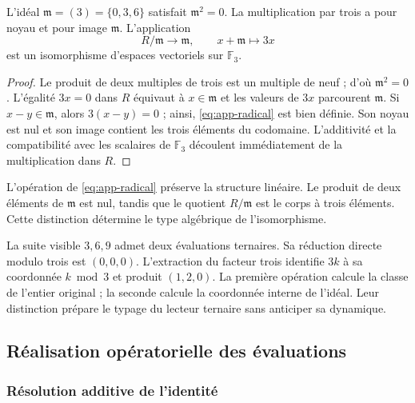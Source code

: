\begin{bloqueindivisible}
\begin{proposicion}
\label{prop:app-radical}
L'idéal $\mathfrak m=(3)=\{0,3,6\}$ satisfait $\mathfrak m^2=0$. La multiplication par trois a pour noyau et pour image $\mathfrak m$. L'application
\begin{equation}
 R/\mathfrak m\longrightarrow\mathfrak m,
 \qquad x+\mathfrak m\longmapsto3x
 \label{eq:app-radical}
\end{equation}
est un isomorphisme d'espaces vectoriels sur $\mathbb F_3$.
\end{proposicion}

\begin{proof}
Le produit de deux multiples de trois est un multiple de neuf ; d'où $\mathfrak m^2=0$. L'égalité $3x=0$ dans $R$ équivaut à $x\in\mathfrak m$ et les valeurs de $3x$ parcourent $\mathfrak m$. Si $x-y\in\mathfrak m$, alors $3(x-y)=0$ ; ainsi, \eqref{eq:app-radical} est bien définie. Son noyau est nul et son image contient les trois éléments du codomaine. L'additivité et la compatibilité avec les scalaires de $\mathbb F_3$ découlent immédiatement de la multiplication dans $R$.
\end{proof}
\end{bloqueindivisible}

L'opération de \eqref{eq:app-radical} préserve la structure linéaire. Le produit de deux éléments de $\mathfrak m$ est nul, tandis que le quotient $R/\mathfrak m$ est le corps à trois éléments. Cette distinction détermine le type algébrique de l'isomorphisme.

La suite visible $3,6,9$ admet deux évaluations ternaires. Sa réduction directe modulo trois est $(0,0,0)$. L'extraction du facteur trois identifie $3k$ à sa coordonnée $k\bmod3$ et produit $(1,2,0)$. La première opération calcule la classe de l'entier original ; la seconde calcule la coordonnée interne de l'idéal. Leur distinction prépare le typage du lecteur ternaire sans anticiper sa dynamique.

\subsection{Réalisation opératorielle des évaluations}
\label{sec:app-operadores}

\subsubsection{Résolution additive de l'identité}

